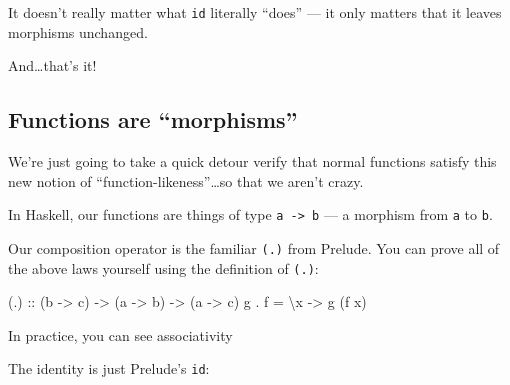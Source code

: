 \documentclass[]{article}
\newenvironment{Shaded}{}{}
\newcommand{\DataTypeTok}[1]{\textcolor[rgb]{0.56,0.13,0.00}{{#1}}}
\newcommand{\DecValTok}[1]{\textcolor[rgb]{0.25,0.63,0.44}{{#1}}}
\newcommand{\OtherTok}[1]{\textcolor[rgb]{0.00,0.44,0.13}{{#1}}}
\newcommand{\FunctionTok}[1]{\textcolor[rgb]{0.02,0.16,0.49}{{#1}}}
\newcommand{\NormalTok}[1]{{#1}}
\begin{document}
It doesn't really matter what \texttt{id} literally ``does'' --- it only
matters that it leaves morphisms unchanged.

And\ldots{}that's it!

\subsection{\texorpdfstring{Functions are
``morphisms''}{Functions are morphisms}}\label{functions-are-morphisms}

We're just going to take a quick detour verify that normal functions
satisfy this new notion of ``function-likeness''\ldots{}so that we
aren't crazy.

In Haskell, our functions are things of type
\texttt{a\ -\textgreater{}\ b} --- a morphism from \texttt{a} to
\texttt{b}.

Our composition operator is the familiar \texttt{(.)} from Prelude. You
can prove all of the above laws yourself using the definition of
\texttt{(.)}:

\begin{Shaded}
\begin{Highlighting}[]
\OtherTok{(.) ::} \NormalTok{(b }\OtherTok{->} \NormalTok{c) }\OtherTok{->} \NormalTok{(a }\OtherTok{->} \NormalTok{b) }\OtherTok{->} \NormalTok{(a }\OtherTok{->} \NormalTok{c)}
\NormalTok{g }\FunctionTok{.} \NormalTok{f }\FunctionTok{=} \NormalTok{\textbackslash{}x }\OtherTok{->} \NormalTok{g (f x)}
\end{Highlighting}
\end{Shaded}

In practice, you can see associativity

\begin{Shaded}
\end{Shaded}

The identity is just Prelude's \texttt{id}:
\end{document}

